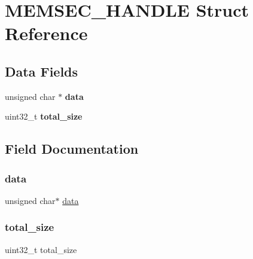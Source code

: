\hypertarget{struct_m_e_m_s_e_c___h_a_n_d_l_e}{}\section{M\+E\+M\+S\+E\+C\+\_\+\+H\+A\+N\+D\+LE Struct Reference}
\label{struct_m_e_m_s_e_c___h_a_n_d_l_e}
\subsection*{Data Fields}
\begin{DoxyCompactItemize}
\item 
\hypertarget{struct_m_e_m_s_e_c___h_a_n_d_l_e_ac24cea2bfcc927fd29bc74d1086707d8}{}\label{struct_m_e_m_s_e_c___h_a_n_d_l_e_ac24cea2bfcc927fd29bc74d1086707d8} 
unsigned char $\ast$ {\bfseries data}
\item 
\hypertarget{struct_m_e_m_s_e_c___h_a_n_d_l_e_acdfd526bb392e1ee59a3c6c545891b48}{}\label{struct_m_e_m_s_e_c___h_a_n_d_l_e_acdfd526bb392e1ee59a3c6c545891b48} 
uint32\+\_\+t {\bfseries total\+\_\+size}
\end{DoxyCompactItemize}


\subsection{Field Documentation}
\hypertarget{struct_m_e_m_s_e_c___h_a_n_d_l_e_ac24cea2bfcc927fd29bc74d1086707d8}{}\label{struct_m_e_m_s_e_c___h_a_n_d_l_e_ac24cea2bfcc927fd29bc74d1086707d8} 
\subsubsection{\texorpdfstring{data}{data}}
{\footnotesize\ttfamily unsigned char$\ast$ \hyperlink{structdata}{data}}

\hypertarget{struct_m_e_m_s_e_c___h_a_n_d_l_e_acdfd526bb392e1ee59a3c6c545891b48}{}\label{struct_m_e_m_s_e_c___h_a_n_d_l_e_acdfd526bb392e1ee59a3c6c545891b48} 
\subsubsection{\texorpdfstring{total\+\_\+size}{total\_size}}
{\footnotesize\ttfamily uint32\+\_\+t total\+\_\+size}

